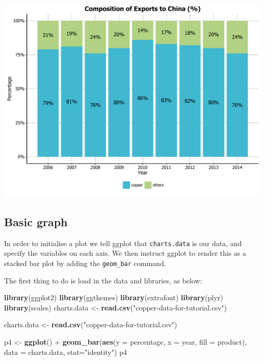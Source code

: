 \documentclass[]{article}
\newenvironment{Shaded}{\begin{snugshade}}{\end{snugshade}}
\newcommand{\KeywordTok}[1]{\textcolor[rgb]{0.13,0.29,0.53}{\textbf{{#1}}}}
\newcommand{\DataTypeTok}[1]{\textcolor[rgb]{0.13,0.29,0.53}{{#1}}}
\newcommand{\StringTok}[1]{\textcolor[rgb]{0.31,0.60,0.02}{{#1}}}
\newcommand{\NormalTok}[1]{{#1}}
\begin{document}
\begin{center}\includegraphics{0_all_posts_pdf/stacked_finalresult-1} \end{center}

\subsection{Basic graph}\label{basic-graph-3}

In order to initialise a plot we tell ggplot that \texttt{charts.data}
is our data, and specify the variables on each axis. We then instruct
ggplot to render this as a stacked bar plot by adding the
\texttt{geom\_bar} command.

The first thing to do is load in the data and libraries, as below:

\begin{Shaded}
\begin{Highlighting}[]
\KeywordTok{library}\NormalTok{(ggplot2)}
\KeywordTok{library}\NormalTok{(ggthemes)}
\KeywordTok{library}\NormalTok{(extrafont)}
\KeywordTok{library}\NormalTok{(plyr)}
\KeywordTok{library}\NormalTok{(scales)}
\NormalTok{charts.data <-}\StringTok{ }\KeywordTok{read.csv}\NormalTok{(}\StringTok{"copper-data-for-tutorial.csv"}\NormalTok{)}
\end{Highlighting}
\end{Shaded}

\begin{Shaded}
\begin{Highlighting}[]
\NormalTok{charts.data <-}\StringTok{ }\KeywordTok{read.csv}\NormalTok{(}\StringTok{"copper-data-for-tutorial.csv"}\NormalTok{)}

\NormalTok{p4 <-}\StringTok{ }\KeywordTok{ggplot}\NormalTok{() +}\StringTok{ }\KeywordTok{geom_bar}\NormalTok{(}\KeywordTok{aes}\NormalTok{(}\DataTypeTok{y =} \NormalTok{percentage, }\DataTypeTok{x =} \NormalTok{year, }\DataTypeTok{fill =} \NormalTok{product), }\DataTypeTok{data =} \NormalTok{charts.data, }
                          \DataTypeTok{stat=}\StringTok{"identity"}\NormalTok{)}
\NormalTok{p4}
\end{Highlighting}
\end{Shaded}
\end{document}
